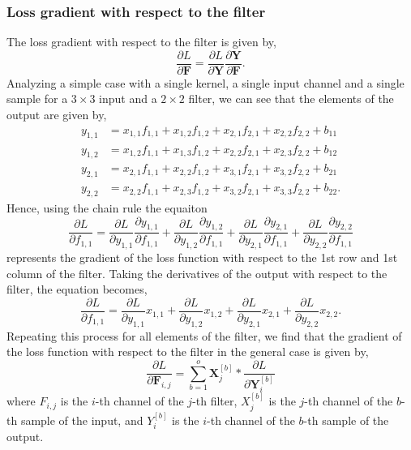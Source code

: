 \documentclass[11pt]{article}
\theoremstyle{definition}
\begin{document}
\subsubsection{Loss gradient with respect to the filter}
The loss gradient with respect to the filter is given by,
\begin{equation}
    \frac{\partial L}{\partial \mathbf{F}} = \frac{\partial L}{\partial \mathbf{Y}} \frac{\partial \mathbf{Y}}{\partial \mathbf{F}}.
\end{equation}
Analyzing a simple case with a single kernel, a single input channel and a single sample
for a $3 \times 3$ input and a $2 \times 2$ filter, we can see that the elements of the 
output are given by,
\begin{equation}
\begin{align*}
    y_{1,1} &= x_{1,1}f_{1,1} + x_{1,2}f_{1,2} + x_{2,1}f_{2,1} + x_{2,2}f_{2,2} + 
    b_{11} \\
    y_{1,2} &= x_{1,2}f_{1,1} + x_{1,3}f_{1,2} + x_{2,2}f_{2,1} + x_{2,3}f_{2,2} + 
    b_{12} \\
    y_{2,1} &= x_{2,1}f_{1,1} + x_{2,2}f_{1,2} + x_{3,1}f_{2,1} + x_{3,2}f_{2,2} + 
    b_{21} \\
    y_{2,2} &= x_{2,2}f_{1,1} + x_{2,3}f_{1,2} + x_{3,2}f_{2,1} + x_{3,3}f_{2,2} +
    b_{22}.
\end{align*}
\end{equation}
Hence, using the chain rule the equaiton
\begin{equation}
    \frac{\partial L}{\partial f_{1,1}} = \frac{\partial L}{\partial y_{1,1}} \frac{\partial y_{1,1}}{\partial f_{1,1}} + \frac{\partial L}{\partial y_{1,2}} \frac{\partial y_{1,2}}{\partial f_{1,1}} + \frac{\partial L}{\partial y_{2,1}} \frac{\partial y_{2,1}}{\partial f_{1,1}} + \frac{\partial L}{\partial y_{2,2}} \frac{\partial y_{2,2}}{\partial f_{1,1}}
\end{equation}
represents the gradient of the loss function with respect to the 1st row and 1st column
of the filter. Taking the derivatives of the output with respect to the filter, the
equation becomes,
\begin{equation}
    \frac{\partial L}{\partial f_{1,1}} = \frac{\partial L}{\partial y_{1,1}} x_{1,1} + \frac{\partial L}{\partial y_{1,2}} x_{1,2} + \frac{\partial L}{\partial y_{2,1}} x_{2,1} + \frac{\partial L}{\partial y_{2,2}} x_{2,2}.
\end{equation}
Repeating this process for all elements of the filter, we find that the gradient of the
loss function with respect to the filter in the general case is given by,
\begin{equation}
    \frac{\partial L}{\partial \mathbf{F}_{i,j}} = \sum_{b=1}^{o} \mathbf{X}_{j}^{[b]} \ast \frac{\partial L}{\partial \mathbf{Y}_{i}^{[b]}}
\end{equation}
where $F_{i,j}$ is the $i$-th channel of the $j$-th filter, $X_{j}^{[b]}$ is the $j$-th
channel of the $b$-th sample of the input, and $Y_{i}^{[b]}$ is the $i$-th channel of 
the $b$-th sample of the output.
\end{document}
